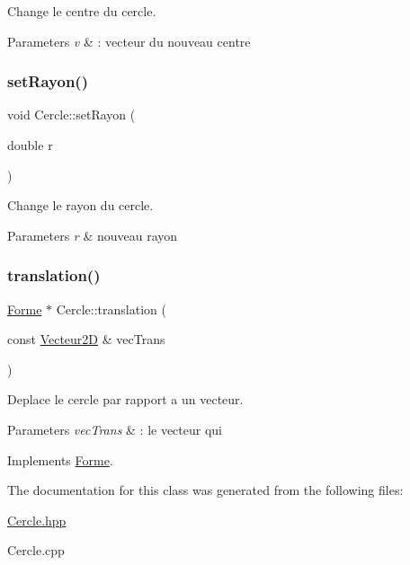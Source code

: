 Change le centre du cercle. 


\begin{DoxyParams}{Parameters}
{\em v} & \+: vecteur du nouveau centre \\
\hline
\end{DoxyParams}
\mbox{\label{class_cercle_a41a16acfa3c2ddeb029c117ca3c2fd34}} 
\subsubsection{\texorpdfstring{setRayon()}{setRayon()}}
{\footnotesize\ttfamily void Cercle\+::set\+Rayon (\begin{DoxyParamCaption}\item[{double}]{r }\end{DoxyParamCaption})\hspace{0.3cm}{\ttfamily [inline]}}



Change le rayon du cercle. 


\begin{DoxyParams}{Parameters}
{\em r} & nouveau rayon \\
\hline
\end{DoxyParams}
\mbox{\label{class_cercle_a5ba23911b0cc2601c06e7397d409406d}} 
\subsubsection{\texorpdfstring{translation()}{translation()}}
{\footnotesize\ttfamily \mbox{\hyperlink{class_forme}{Forme}} $\ast$ Cercle\+::translation (\begin{DoxyParamCaption}\item[{const \mbox{\hyperlink{class_vecteur2_d}{Vecteur2D}} \&}]{vec\+Trans }\end{DoxyParamCaption})\hspace{0.3cm}{\ttfamily [virtual]}}



Deplace le cercle par rapport a un vecteur. 


\begin{DoxyParams}{Parameters}
{\em vec\+Trans} & \+: le vecteur qui \\
\hline
\end{DoxyParams}


Implements \mbox{\hyperlink{class_forme}{Forme}}.



The documentation for this class was generated from the following files\+:\begin{DoxyCompactItemize}
\item 
\mbox{\hyperlink{_cercle_8hpp}{Cercle.\+hpp}}\item 
Cercle.\+cpp\end{DoxyCompactItemize}
